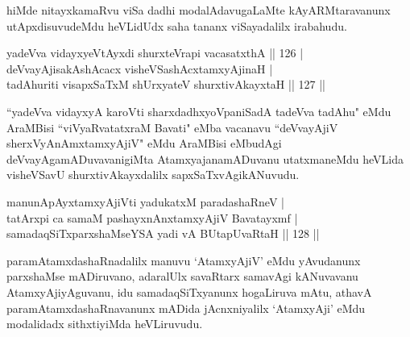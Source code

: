 \begin{artha}
hiMde nitayxkamaRvu viSa dadhi modalAdavugaLaMte kAyARMtaravanunx utApxdisuvudeMdu heVLidUdx saha tananx viSayadalilx irabahudu.
\end{artha}

\begin{shl}
yadeVva vidayxyeVtAyxdi shurxteVrapi vacasatxthA \hfill || 126 |\\
deVvayAjisakAshAcacx visheVSashAcx\s \s tamxyAjinaH |\\
tadAhuriti visapxSaTxM shUrxyateV shurxtivAkayxtaH \hfill || 127 ||
\end{shl}

\begin{artha}
``yadeVva vidayxyA karoVti sharxdadhxyoVpaniSadA tadeVva tadAhu"  eMdu AraMBisi ``viVyaRvatatxraM Bavati" eMba vacanavu ``deVvayAjiV sherxVyAnAmxtamxyAjiV" eMdu AraMBisi eMbudAgi deVvayAgamADuvavanigiMta AtamxyajanamADuvanu utatxmaneMdu heVLida visheVSavU shurxtivAkayxdalilx sapxSaTxvAgikANuvudu.
\end{artha}

\begin{shl}
\footnotemark{}manunA\s pAyxtamxyAjiVti yadukatxM paradashaRneV |\\
tatArxpi ca samaM pashayxnAnxtamxyAjiV Bavatayxmf |\\
samadaqSiTxparxshaMseYSA yadi vA \footnotemark{}BUtapUvaRtaH \hfill || 128 ||
\end{shl}
\begin{artha}
paramAtamxdashaRnadalilx manuvu `AtamxyAjiV' eMdu yAvudanunx parxshaMse mADiruvano, adaralUlx savaRtarx samavAgi kANuvavanu AtamxyAjiyAguvanu, idu samadaqSiTxyanunx hogaLiruva mAtu, athavA paramAtamxdashaRnavanunx mADida jAcnxniyalilx `AtamxyAji' eMdu modalidadx sithxtiyiMda heVLiruvudu.
\end{artha}

